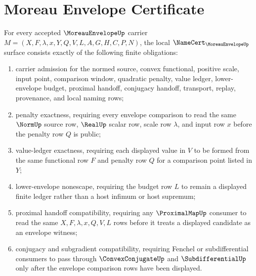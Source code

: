 \section{Moreau Envelope Certificate}
\label{sec:moreau-envelope-certificate}

\begin{theorem}
\label{thm:moreau-envelope-namecert-obligations}
For every accepted $\MoreauEnvelopeUp$ carrier $M=(X,F,\lambda,x,Y,Q,V,L,A,G,H,C,P,N)$, the local $\NameCert_{\MoreauEnvelopeUp}$ surface consists exactly of the following finite obligations:
\begin{enumerate}
\item carrier admission for the normed source, convex functional, positive scale, input point, comparison window, quadratic penalty, value ledger, lower-envelope budget, proximal handoff, conjugacy handoff, transport, replay, provenance, and local naming rows;
\item penalty exactness, requiring every envelope comparison to read the same $\NormUp$ source row, $\RealUp$ scalar row, scale row $\lambda$, and input row $x$ before the penalty row $Q$ is public;
\item value-ledger exactness, requiring each displayed value in $V$ to be formed from the same functional row $F$ and penalty row $Q$ for a comparison point listed in $Y$;
\item lower-envelope nonescape, requiring the budget row $L$ to remain a displayed finite ledger rather than a host infimum or host supremum;
\item proximal handoff compatibility, requiring any $\ProximalMapUp$ consumer to read the same $X,F,\lambda,x,Q,V,L$ rows before it treats a displayed candidate as an envelope witness;
\item conjugacy and subgradient compatibility, requiring Fenchel or subdifferential consumers to pass through $\ConvexConjugateUp$ and $\SubdifferentialUp$ only after the envelope comparison rows have been displayed.
\end{enumerate}
\end{theorem}
